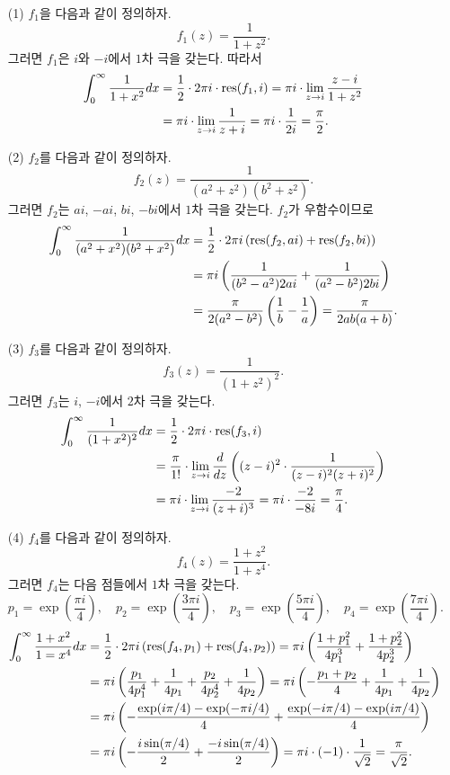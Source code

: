 \begin{itemize}
\item[(1)] $f_1$을 다음과 같이 정의하자.
\[
f_1(z) = \dfrac1{1+z^2}.
\]
그러면 $f_1$은 $i$와 $-i$에서 $1$차 극을 갖는다. 따라서
\begin{align*}
\int_0^\infty \displaystyle\frac1{1+x^2}dx &= \displaystyle\frac12 \cdot2\pi i \cdot \mathop{\mathrm{res}}(f_1, i)
= \pi i \cdot \lim_{z\to i} \displaystyle\frac{z-i}{1+z^2} \\
&= \pi i \cdot \lim_{z\to i} \displaystyle\frac1{z+i} = \pi i \cdot \displaystyle\frac1{2i} = \displaystyle\frac\pi 2.
\end{align*}
\item[(2)] $f_2$를 다음과 같이 정의하자.
\[
f_2(z) = \dfrac1{(a^2+z^2)(b^2+z^2)}.
\]
그러면 $f_2$는 $ai$, $-ai$, $bi$, $-bi$에서 $1$차 극을 갖는다. 
$f_2$가 우함수이므로
\begin{align*}
\int_0^\infty \displaystyle\frac1{(a^2+x^2)(b^2+x^2)}dx
&= \displaystyle\frac12 \cdot 2\pi i \left( \mathop{\mathrm{res}}(f_2, ai) + \mathop{\mathrm{res}}(f_2, bi) \right) \\
&= \pi i \left( \displaystyle\frac1{(b^2-a^2)2ai} + \displaystyle\frac1{(a^2-b^2)2bi} \right) \\
&= \displaystyle\frac\pi{2(a^2-b^2)} \left( \displaystyle\frac1b-\displaystyle\frac1a\right) = \displaystyle\frac\pi{2ab(a+b)}.
\end{align*}
\item[(3)]  $f_3$를 다음과 같이 정의하자.
\[
f_3(z) = \dfrac1{(1+z^2)^2}.
\]
그러면 $f_3$는 $i$, $-i$에서 $2$차 극을 갖는다. 
\begin{align*}
\int_0^\infty \displaystyle\frac1{(1+x^2)^2}dx
&= \displaystyle\frac12 \cdot 2\pi i \cdot \mathop{\mathrm{res}}(f_3, i) \\
&= \displaystyle\frac\pi{1!}\cdot \lim_{z\to i} \displaystyle\frac d{dz} \left(
(z-i)^2 \cdot \displaystyle\frac1{(z-i)^2(z+i)^2} \right) \\
&= \pi i \cdot \lim_{z\to i} \displaystyle\frac{-2}{(z+i)^3} = \pi i \cdot \displaystyle\frac{-2}{-8i}
= \displaystyle\frac\pi4.
\end{align*}
\item[(4)] $f_4$를 다음과 같이 정의하자.
\[
f_4(z) = \dfrac{1+z^2}{1+z^4}.
\]
그러면 $f_4$는 다음 점들에서 $1$차 극을 갖는다. 
\[
p_1 =\exp\left(\dfrac{\pi i }4\right), \quad
p_2 =\exp\left(\dfrac{3\pi i }4\right), \quad
p_3 =\exp\left(\dfrac{5\pi i }4\right), \quad
p_4 =\exp\left(\dfrac{7\pi i }4\right).
\]
\begin{align*}
\int_0^\infty \displaystyle\frac{1+x^2}{1=x^4}dx 
&= \displaystyle\frac12\cdot 2\pi  i\left(\mathop{\mathrm{res}}(f_4,p_1) + \mathop{\mathrm{res}}(f_4,p_2) \right)
=\pi i \left( \displaystyle\frac{1+p_1^2}{4p_1^3} + \displaystyle\frac{1+p_2^2}{4p_2^3} \right) \\
&= \pi i \left( \displaystyle\frac{p_1}{4p_1^4} + \displaystyle\frac1{4p_1} + \displaystyle\frac{p_2}{4p_2^4} + \displaystyle\frac1{4p_2} \right)
= \pi i \left( - \displaystyle\frac{p_1+p_2}{4} + \displaystyle\frac1{4p_1} + \displaystyle\frac1{4p_2} \right) \\
&= \pi i \left( - \displaystyle\frac{\exp(i\pi/4) - \exp(-\pi i/4)}4 
+ \displaystyle\frac{\exp(-i\pi/4) - \exp(i\pi/4)}4 \right) \\
&= \pi i \left( - \displaystyle\frac{i\sin(\pi/4)}2 + \displaystyle\frac{-i\sin(\pi/4)}2 \right)
= \pi i \cdot(-1) \cdot \displaystyle\frac1{\sqrt{2}} = \displaystyle\frac\pi{\sqrt{2}}.
\end{align*}
\end{itemize}
 
